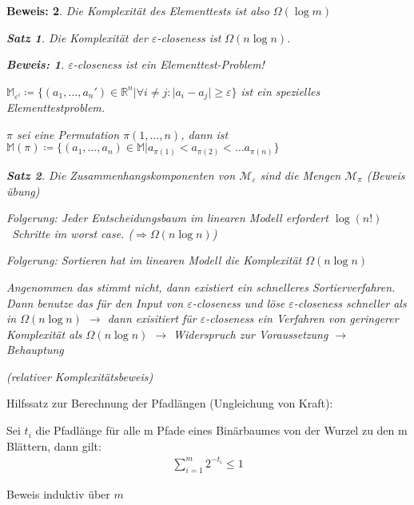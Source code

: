 \documentclass[ngerman,draft,parskip=half*,twoside]{scrreprt}
\theoremstyle{break}
\newtheorem{satz}{Satz}[chapter]
\theoremstyle{nonumberbreak}
\newtheorem{beweis}{Beweis:}
\newcommand*{\M}{\mathbb{M}}
\newcommand*{\R}{\mathbb{R}}        %
\begin{document}
\begin{beweis}
Die Komplexität des Elementtests ist also $ \Omega (\log m) $	
  \begin{satz}
  Die Komplexität der $\varepsilon$-closeness ist $ \Omega (n \log n) $.
  \end{satz}

  \begin{beweis}
  $\varepsilon$-closeness ist ein Elementtest-Problem!

  $ \M_{\varepsilon^i} \coloneqq  \lbrace ( a_1, \dots , a_n ') \in \R^n \vert \forall   i \ne j : \vert a_i - a_j 
  \vert \geq \varepsilon \rbrace$ ist ein spezielles Elementtestproblem.
				
  $\pi$ sei eine Permutation $ \pi(1, \dots ,n) $, dann ist
  $ \M(\pi ) \coloneqq  \lbrace (a_1, \dots , a_n) \in \M \vert a_{\pi (1)} < a_{\pi (2)} < \dots a_{\pi (n)}  \rbrace $
	
	
  \begin{satz} 
  Die Zusammenhangskomponenten von $ \mathcal{M}_\varepsilon $ sind die Mengen $ \mathcal{M}_\pi  $ (\textup{Beweis übung})
  \end{satz}		
		
  \textit{Folgerung: Jeder Entscheidungsbaum im linearen Modell erfordert $\log (n!)$~Schritte im worst case. 
  ($\Rightarrow \Omega (n \log n)$)}
		
  \end{beweis}	
\textit{Folgerung: Sortieren hat im linearen Modell die Komplexität $\Omega (n \log n)$}
	
Angenommen das stimmt nicht, dann existiert ein schnelleres Sortierverfahren. 
Dann benutze das für den Input von $\varepsilon$-closeness und löse $\varepsilon$-closeness schneller als in $ \Omega (n \log n)$
$ \rightarrow $ dann exisitiert für $\varepsilon$-closeness ein Verfahren von geringerer Komplexität als $ \Omega (n \log n) $
$ \rightarrow $ Widerspruch zur Voraussetzung $ \rightarrow $ Behauptung
		
(relativer Komplexitätsbeweis)
\end{beweis}


% 
Hilfssatz zur Berechnung der Pfadlängen (Ungleichung von Kraft):


Sei $t_{i}$ die Pfadlänge für alle m Pfade eines Binärbaumes von der Wurzel zu den m Blättern, dann gilt:
\begin{gather*}
\sum_{i=1}^{m} 2^{-t_{i}}\leq 1
\end{gather*} 


Beweis induktiv über $m$
\end{document}
